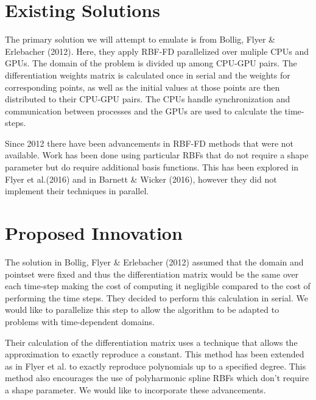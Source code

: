 \documentclass[12pt]{article}
\begin{document}

\section{Existing Solutions}
	The primary solution we will attempt to emulate is from Bollig, Flyer \& Erlebacher (2012)\cite{Bollig2012}. Here, they apply RBF-FD parallelized over muliple CPUs and GPUs. The domain of the problem is divided up among CPU-GPU pairs. The differentiation weights matrix is calculated once in serial and the weights for corresponding points, as well as the initial values at those points are then distributed to their CPU-GPU pairs. The CPUs handle synchronization and communication between processes and the GPUs are used to calculate the time-steps.
	
	Since 2012 there have been advancements in RBF-FD methods that were not available. Work has been done using particular RBFs that do not require a shape parameter but do require additional basis functions. This has been explored in 
	Flyer et al.(2016)\cite{Flyer2016-1}\cite{Flyer2017-2} and in Barnett \& Wicker (2016)\cite{FlyerBarnettWicker2016}, however they did not implement their techniques in parallel.
	


\section{Proposed Innovation}
	The solution in Bollig, Flyer \& Erlebacher (2012)\cite{Bollig2012} assumed that the domain and pointset were fixed and thus the differentiation matrix would be the same over each time-step making the cost of computing it negligible compared to the cost of performing the time steps. They decided to perform this calculation in serial. We would like to parallelize this step to allow the algorithm to be adapted to problems with time-dependent domains.
	
	Their calculation of the differentiation matrix uses a technique that allows the approximation to exactly reproduce a constant. This method has been extended as in Flyer et al.\cite{Flyer2016-1}\cite{Flyer2017-2} to exactly reproduce polynomials up to a specified degree. This method also encourages the use of polyharmonic spline RBFs which don't require a shape parameter. We would like to incorporate these advancements.
	
\end{document}
